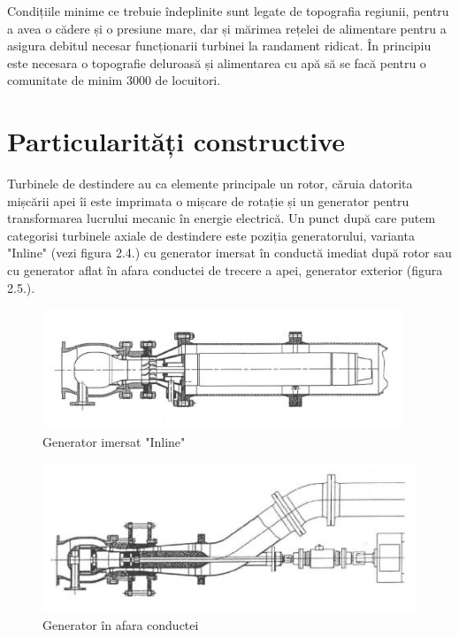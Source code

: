 Condițiile minime ce trebuie îndeplinite sunt legate de topografia regiunii, pentru a avea o cădere și o presiune mare, dar și mărimea rețelei de alimentare pentru a asigura debitul necesar funcționarii turbinei la randament ridicat. În principiu este necesara o topografie deluroasă și alimentarea cu apă să se facă pentru o comunitate de minim 3000 de locuitori.


\section{Particularități constructive}

Turbinele de destindere au ca elemente principale un rotor, căruia datorita mișcării apei îi este imprimata o mișcare de rotație și un generator pentru transformarea lucrului mecanic în energie electrică. Un punct după care putem categorisi turbinele axiale de destindere este poziția generatorului, varianta "Inline" (vezi figura 2.4.) cu generator imersat în conductă imediat după rotor sau cu generator aflat în afara conductei de trecere a apei, generator exterior (figura 2.5.).

\begin{figure}[h!]
	\centering
	\includegraphics[scale=1]{figures/generator_inline.jpg}
	\caption{Generator imersat "Inline" \protect\cite{GREES_2014}}
	\label{Generator imersat Inline}
\end{figure}

\begin{figure}[h!]
	\centering
	\includegraphics[scale=1]{figures/generator_in_afara_conductei.jpg}
	\caption{Generator în afara conductei \protect\cite{GREES_2014}}
	\label{Generator în afara conductei}
\end{figure}

